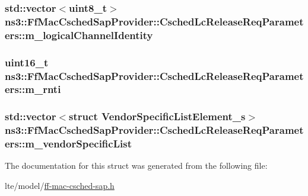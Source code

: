 \subsubsection[{\texorpdfstring{m\+\_\+logical\+Channel\+Identity}{m_logicalChannelIdentity}}]{\setlength{\rightskip}{0pt plus 5cm}std\+::vector$<$uint8\+\_\+t$>$ ns3\+::\+Ff\+Mac\+Csched\+Sap\+Provider\+::\+Csched\+Lc\+Release\+Req\+Parameters\+::m\+\_\+logical\+Channel\+Identity}\hypertarget{structns3_1_1FfMacCschedSapProvider_1_1CschedLcReleaseReqParameters_aa66207369a8c82bc737b2274e12019a1}{}\label{structns3_1_1FfMacCschedSapProvider_1_1CschedLcReleaseReqParameters_aa66207369a8c82bc737b2274e12019a1}
\subsubsection[{\texorpdfstring{m\+\_\+rnti}{m_rnti}}]{\setlength{\rightskip}{0pt plus 5cm}uint16\+\_\+t ns3\+::\+Ff\+Mac\+Csched\+Sap\+Provider\+::\+Csched\+Lc\+Release\+Req\+Parameters\+::m\+\_\+rnti}\hypertarget{structns3_1_1FfMacCschedSapProvider_1_1CschedLcReleaseReqParameters_a7485bc62a1c7ea64d927b2cc1673c9ef}{}\label{structns3_1_1FfMacCschedSapProvider_1_1CschedLcReleaseReqParameters_a7485bc62a1c7ea64d927b2cc1673c9ef}
\subsubsection[{\texorpdfstring{m\+\_\+vendor\+Specific\+List}{m_vendorSpecificList}}]{\setlength{\rightskip}{0pt plus 5cm}std\+::vector$<$struct {\bf Vendor\+Specific\+List\+Element\+\_\+s}$>$ ns3\+::\+Ff\+Mac\+Csched\+Sap\+Provider\+::\+Csched\+Lc\+Release\+Req\+Parameters\+::m\+\_\+vendor\+Specific\+List}\hypertarget{structns3_1_1FfMacCschedSapProvider_1_1CschedLcReleaseReqParameters_a9b62e97cd837b4c0f824aed134d2db20}{}\label{structns3_1_1FfMacCschedSapProvider_1_1CschedLcReleaseReqParameters_a9b62e97cd837b4c0f824aed134d2db20}


The documentation for this struct was generated from the following file\+:\begin{DoxyCompactItemize}
\item 
lte/model/\hyperlink{ff-mac-csched-sap_8h}{ff-\/mac-\/csched-\/sap.\+h}\end{DoxyCompactItemize}

